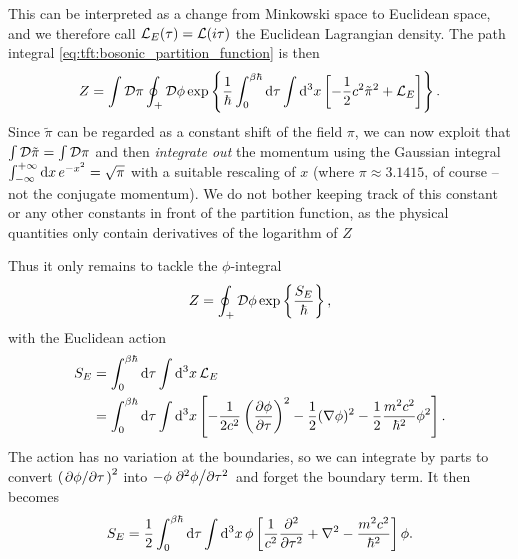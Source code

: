 This can be interpreted as a change from Minkowski space to Euclidean space, and we therefore call $\mathcal{L}_E(\tau) = \mathcal{L}(i \tau)$ the Euclidean Lagrangian density.
The path integral \eqref{eq:tft:bosonic_partition_function} is then
\begin{equation}
	Z = \int \mathcal{D} \pi \oint_+ \mathcal{D} \phi \exp \left\{ \frac{1}{\hbar} \int_0^{\beta \hbar} \mathop{}\!\mathrm{d} \tau \int \mathop{}\!\mathrm{d}^3 x \left[ - \frac12 c^2 \tilde\pi^2 + \mathcal{L}_E \right] \right\} .
\end{equation}
Since $\tilde\pi$ can be regarded as a constant shift of the field $\pi$, we can now exploit that $\int \mathcal{D} \tilde\pi = \int \mathcal{D} \pi$ and then \emph{integrate out} the momentum using the Gaussian integral $\int_{-\infty}^{+\infty} \mathop{}\!\mathrm{d} x \, e^{-x^2} = \sqrt{\pi}$ with a suitable rescaling of $x$ (where $\pi \approx 3.1415$, of course -- not the conjugate momentum).
We do not bother keeping track of this constant or any other constants in front of the partition function, as the physical quantities only contain derivatives of the logarithm of $Z$ 



Thus it only remains to tackle the $\phi$-integral
\begin{equation}
	Z = \oint_+ \mathcal{D} \phi \exp \left\{ \frac{S_E}{\hbar} \right\} ,
\label{eq:tft:boson_partition_function_momentum_out}
\end{equation}
with the Euclidean action
\begin{equation}
\begin{split}
	S_E &= \int_0^{\beta \hbar} \mathop{}\!\mathrm{d} \tau \int \mathop{}\!\mathrm{d}^3 x \, \mathcal{L}_E \\
	    &= \int_0^{\beta \hbar} \mathop{}\!\mathrm{d} \tau \int \mathop{}\!\mathrm{d}^3 x \left[ - \frac{1}{2c^2} \pdv{\phi}{\tau}^2 - \frac12 (\nabla \phi)^2 - \frac12 \frac{m^2 c^2}{\hbar^2} \phi^2 \right] .
\end{split}
\label{eq:tft:boson_euclidean_action_definition}
\end{equation}
The action has no variation at the boundaries, so we can integrate by parts to convert $\pdv{\phi}/{\tau}^2$ into $-\phi \pdv[2]{\phi}/{\tau}$ and forget the boundary term.
It then becomes
\begin{equation}
	S_E = \frac12 \int_0^{\beta \hbar} \mathop{}\!\mathrm{d} \tau \int \mathop{}\!\mathrm{d}^3 x \, \phi \left[ \frac{1}{c^2} \pdv[2]{}{\tau} + \nabla^2 - \frac{m^2 c^2}{\hbar^2} \right] \phi .
\label{eq:tft:boson_euclidean_action_nice}
\end{equation}

